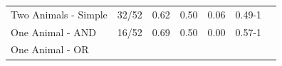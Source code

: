 \documentclass[floatsintext,man]{apa6}
\theoremstyle{definition}
\theoremstyle{definition}
\theoremstyle{definition}
\theoremstyle{remark}
\begin{document}
\begin{longtable}[]{@{}lllllll@{}}
\midrule
\endhead
\begin{minipage}[t]{0.23\columnwidth}\raggedright\strut
Two Animals - Simple\strut
\end{minipage} & \begin{minipage}[t]{0.19\columnwidth}\raggedright\strut
32/52\strut
\end{minipage} & \begin{minipage}[t]{0.08\columnwidth}\raggedright\strut
0.62\strut
\end{minipage} & \begin{minipage}[t]{0.08\columnwidth}\raggedright\strut
0.50\strut
\end{minipage} & \begin{minipage}[t]{0.08\columnwidth}\raggedright\strut
0.06\strut
\end{minipage} & \begin{minipage}[t]{0.08\columnwidth}\raggedright\strut
0.49-1\strut
\end{minipage} & \begin{minipage}[t]{0.08\columnwidth}\raggedright\strut
\strut
\end{minipage}\tabularnewline
\begin{minipage}[t]{0.23\columnwidth}\raggedright\strut
One Animal - AND\strut
\end{minipage} & \begin{minipage}[t]{0.19\columnwidth}\raggedright\strut
16/52\strut
\end{minipage} & \begin{minipage}[t]{0.08\columnwidth}\raggedright\strut
0.69\strut
\end{minipage} & \begin{minipage}[t]{0.08\columnwidth}\raggedright\strut
0.50\strut
\end{minipage} & \begin{minipage}[t]{0.08\columnwidth}\raggedright\strut
0.00\strut
\end{minipage} & \begin{minipage}[t]{0.08\columnwidth}\raggedright\strut
0.57-1\strut
\end{minipage} & \begin{minipage}[t]{0.08\columnwidth}\raggedright\strut
\strut
\end{minipage}\tabularnewline
\begin{minipage}[t]{0.23\columnwidth}\raggedright\strut
One Animal - OR\strut
\end{minipage} & \begin{minipage}[t]{0.19\columnwidth}\raggedright\strut

\end{minipage}
\end{longtable}
\end{document}
